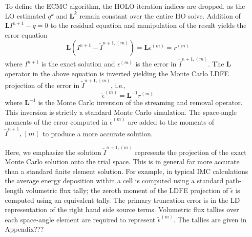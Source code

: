 \documentclass{mc2013}
\newcommand{\B}[1]{\ensuremath{\mathbf{#1}}}
\begin{document}
To define the ECMC algorithm, the HOLO iteration indices
are dropped, as the LO estimated $q^{k}$ and $\B L^{k}$ remain constant over the entire HO solve.
Addition of $\B L I^{n+1} - q=0$ to the residual equation 
and manipulation of the result yields the error equation
\begin{equation}
    \B L (I^{n+1} - \tilde{I}^{n+1,(m)}) = \B L {\epsilon}^{(m)} = r^{(m)}
\end{equation}
where $I^{n+1}$ is the exact solution and ${\epsilon}^{(m)}$ is the error in
$\tilde{I}^{n+1,(m)}$. The $\B L$ operator in the above equation is inverted yielding
the Monte Carlo LDFE projection of the error in $\tilde{I}^{n+1,(m)}$, i.e., 
\begin{equation}
\tilde{\epsilon}^{(m)} = \B L^{-1} r^{(m)}
\end{equation}
where $\B L^{-1}$ is the Monte Carlo inversion of the streaming and removal operator.
This inversion is strictly a standard Monte Carlo simulation.  The space-angle moments of the
error computed in $\tilde{\epsilon}^{(m)}$ are added to the moments of
$\tilde{I}^{n+1},(m)$ to produce a more accurate solution.

Here, we emphasize the solution $\tilde{I}^{n+1,(m)}$ represents the projection of the exact Monte Carlo
solution onto the trial space.  This is in general far more accurate than a standard
finite element solution.  For example, in typical IMC calculations the average energy
deposition within a cell is computed using a standard path-length volumetric flux
tally; the zeroth moment of the LDFE projection of $\tilde{\epsilon}$ is computed
using an equivalent tally.  The primary truncation error is in the LD
representation of the right hand side source terms.  Volumetric flux tallies over
each space-angle element are required to represent $\tilde{\epsilon}^{(m)}$.  The
tallies are given in Appendix??? 
\end{document}
